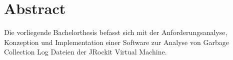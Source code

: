 \chapter*{Abstract}
Die vorliegende Bachelorthesis befasst sich mit der Anforderungsanalyse, Konzeption und Implementation einer Software zur Analyse von Garbage Collection Log Dateien der JRockit Virtual Machine.